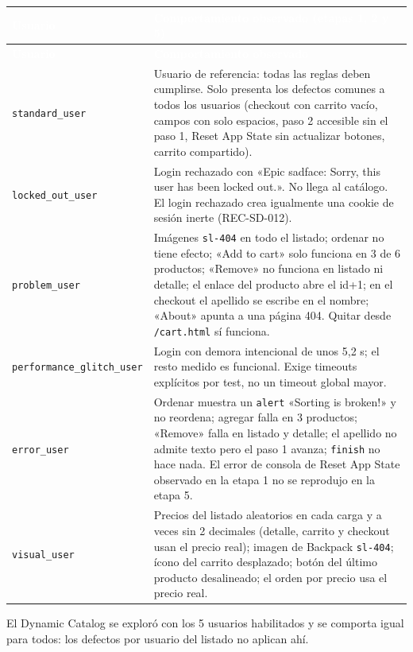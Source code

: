 \documentclass[10pt,a4paper]{article}
\newcommand{\tabhead}{\rowcolor{primary}}
\newcommand{\hcell}[1]{\textcolor{white}{\bfseries #1}}
\newcommand{\zebrarows}{\rowcolors{2}{zebra}{white}}
\begin{document}
{\zebrarows
\begin{longtable}{|L{0.2\textwidth}|L{0.72\textwidth}|}
\hline
\tabhead \hcell{Usuario} & \hcell{Comportamiento observado (etapas 1, 2 y 5)} \\ \hline
\endfirsthead
\hline
\tabhead \hcell{Usuario} & \hcell{Comportamiento observado} \\ \hline
\endhead
\texttt{standard\_user} & Usuario de referencia: todas las reglas deben cumplirse. Solo presenta los defectos comunes a todos los usuarios (checkout con carrito vacío, campos con solo espacios, paso 2 accesible sin el paso 1, Reset App State sin actualizar botones, carrito compartido). \\ \hline
\texttt{locked\_out\_user} & Login rechazado con «Epic sadface: Sorry, this user has been locked out.». No llega al catálogo. El login rechazado crea igualmente una cookie de sesión inerte (REC-SD-012). \\ \hline
\texttt{problem\_user} & Imágenes \texttt{sl-404} en todo el listado; ordenar no tiene efecto; «Add to cart» solo funciona en 3 de 6 productos; «Remove» no funciona en listado ni detalle; el enlace del producto abre el id+1; en el checkout el apellido se escribe en el nombre; «About» apunta a una página 404. Quitar desde \texttt{/cart.html} sí funciona. \\ \hline
\texttt{performance\_\allowbreak glitch\_\allowbreak user} & Login con demora intencional de unos 5,2 s; el resto medido es funcional. Exige timeouts explícitos por test, no un timeout global mayor. \\ \hline
\texttt{error\_user} & Ordenar muestra un \texttt{alert} «Sorting is broken!» y no reordena; agregar falla en 3 productos; «Remove» falla en listado y detalle; el apellido no admite texto pero el paso 1 avanza; \texttt{finish} no hace nada. El error de consola de Reset App State observado en la etapa 1 no se reprodujo en la etapa 5. \\ \hline
\texttt{visual\_user} & Precios del listado aleatorios en cada carga y a veces sin 2 decimales (detalle, carrito y checkout usan el precio real); imagen de Backpack \texttt{sl-404}; ícono del carrito desplazado; botón del último producto desalineado; el orden por precio usa el precio real. \\ \hline
\end{longtable}}

El Dynamic Catalog se exploró con los 5 usuarios habilitados y se comporta igual para todos: los defectos por usuario del listado no aplican ahí.
\end{document}
